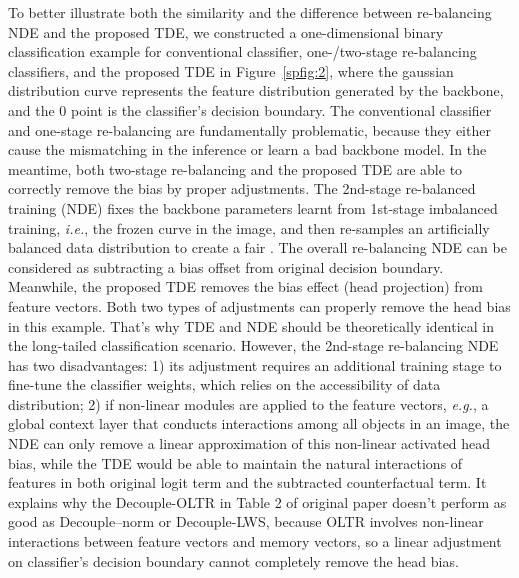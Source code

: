 \documentclass{article}
\newcommand{\ie}{\textit{i.e.}}
\newcommand{\eg}{\textit{e.g.}}
\begin{document}
To better illustrate both the similarity and the difference between re-balancing NDE and the proposed TDE, we constructed a one-dimensional binary classification example for conventional classifier, one-/two-stage re-balancing classifiers, and the proposed TDE in Figure~\ref{spfig:2}, where the gaussian distribution curve represents the feature distribution generated by the backbone, and the 0 point is the classifier's decision boundary. The conventional classifier and one-stage re-balancing are fundamentally problematic, because they either cause the mismatching in the inference or learn a bad backbone model. In the meantime, both two-stage re-balancing and the proposed TDE are able to correctly remove the bias by proper adjustments. The 2nd-stage re-balanced training (NDE) fixes the backbone parameters  learnt from 1st-stage imbalanced training, \ie, the frozen curve in the image, and then re-samples an artificially balanced data distribution to create a fair . The overall re-balancing NDE can be considered as subtracting a bias offset from original decision boundary. Meanwhile, the proposed TDE removes the bias effect (head projection) from feature vectors. Both two types of adjustments can properly remove the head bias in this example. That's why TDE and NDE should be theoretically identical in the long-tailed classification scenario. However, the 2nd-stage re-balancing NDE has two disadvantages: 1) its adjustment requires an additional training stage to fine-tune the classifier weights, which relies on the accessibility of data distribution; 2) if non-linear modules are applied to the feature vectors, \eg, a global context layer that conducts interactions among all objects  in an image, the NDE can only remove a linear approximation of this non-linear activated head bias, while the TDE would be able to maintain the natural interactions of features in both original logit term and the subtracted counterfactual term. It explains why the Decouple-OLTR in Table 2 of original paper doesn't perform as good as Decouple--norm or Decouple-LWS, because OLTR involves non-linear interactions between feature vectors and memory vectors, so a linear adjustment on classifier's decision boundary cannot completely remove the head bias.
\end{document}
